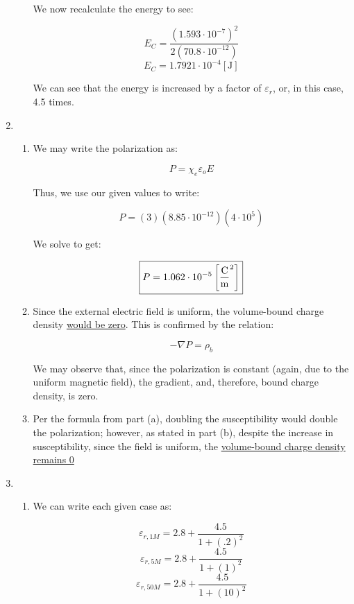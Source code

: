 \begin{enumerate}
\begin{enumerate}
        We now recalculate the energy to see:

        $$E_C=\frac{(1.593\cdot10^{-7})^2}{2(70.8\cdot10^{-12})}$$
        $$\boxed{E_C=1.7921\cdot10^{-4}[\si{\joule}]}$$

        We can see that the energy is increased by a factor of $\varepsilon_r$, or, in this case, 4.5 times.

    \end{enumerate}

  \item

    \begin{enumerate}

      \item We may write the polarization as:

        $$P=\chi_e\varepsilon_oE$$

        Thus, we use our given values to write:

        $$P=(3)(8.85\cdot10^{-12})(4\cdot10^5)$$

        We solve to get:

        $$\boxed{P=1.062\cdot10^{-5}\left[ \si{\coulomb\over\square\meter} \right]}$$

      \item Since the external electric field is uniform, the volume-bound charge density \underline{would be zero}. This is confirmed by the relation:

        $$-\nabla P=\rho_b$$

        We may observe that, since the polarization is constant (again, due to the uniform magnetic field), the gradient, and, therefore, bound charge density, is zero.

      \item Per the formula from part (a), doubling the susceptibility would double the polarization; however, as stated in part (b), despite the increase in susceptibility, since the field is uniform, the \underline{volume-bound charge density remains 0}

    \end{enumerate}

  \item

    \begin{enumerate}

      \item We can write each given case as:

        $$\varepsilon_{r,1M}=2.8+\frac{4.5}{1+(.2)^2}$$
        $$\varepsilon_{r,5M}=2.8+\frac{4.5}{1+(1)^2}$$
        $$\varepsilon_{r,50M}=2.8+\frac{4.5}{1+(10)^2}$$


\end{enumerate}
\end{enumerate}

